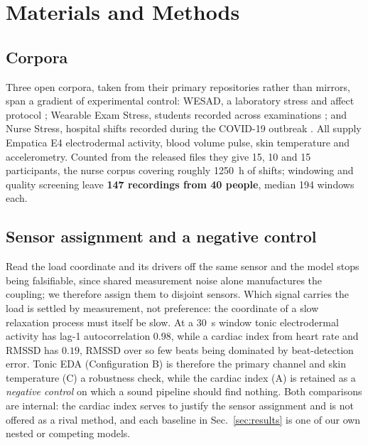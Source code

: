 \documentclass[conference]{IEEEtran}
\begin{document}
\section{Materials and Methods}
\label{sec:methods}

\subsection{Corpora}
Three open corpora, taken from their primary repositories rather than
mirrors, span a gradient of experimental control: WESAD, a laboratory stress
and affect protocol \cite{schmidt2018wesad}; Wearable Exam Stress, students
recorded across examinations \cite{amin2022exam}; and Nurse Stress, hospital
shifts recorded during the COVID-19 outbreak \cite{hosseini2022nurse}. All
supply Empatica E4 electrodermal activity, blood volume pulse, skin temperature
and accelerometry. Counted from the released files they give 15, 10 and 15
participants, the nurse corpus covering roughly \SI{1250}{\hour} of shifts;
windowing and quality screening leave \textbf{147 recordings from 40 people},
median 194 windows each.

\subsection{Sensor assignment and a negative control}
Read the load coordinate and its drivers off the same sensor and the model stops
being falsifiable, since shared measurement noise alone manufactures the
coupling; we therefore assign them to disjoint sensors. Which signal carries the
load is settled by measurement, not preference: the coordinate of a slow
relaxation process must itself be slow. At a \SI{30}{\second} window tonic
electrodermal activity has lag-1 autocorrelation $0.98$, while a cardiac index
from heart rate and RMSSD has $0.19$, RMSSD over so few beats being dominated by
beat-detection error. Tonic EDA (Configuration B) is therefore the primary
channel and skin temperature (C) a robustness check, while the cardiac index
(A) is retained as a \emph{negative control} on which a sound pipeline should
find nothing. Both comparisons are internal: the cardiac index serves to
justify the sensor assignment and is not offered as a rival method, and each
baseline in Sec.~\ref{sec:results} is one of our own nested or competing
models.
\end{document}
